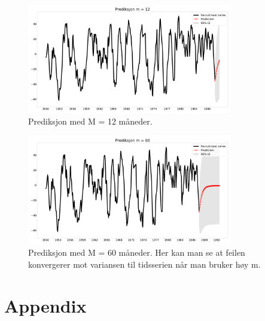 \begin{figure}[hbt!]
    {\centering
        \includegraphics[width=0.80\textwidth]{task_3.pdf}
        \caption{Prediksjon med M = 12 måneder.}
        \label{task_3}
    \par}
    \end{figure}

    \begin{figure}[hbt!]
        {\centering
            \includegraphics[width=0.80\textwidth]{task_33.pdf}
            \caption{Prediksjon med M = 60 måneder. Her kan man se at feilen konvergerer mot variansen til tidsserien når man bruker høy m.}
            \label{task_33}
        \par}
        \end{figure}











\clearpage
\newpage

\section{Appendix}


